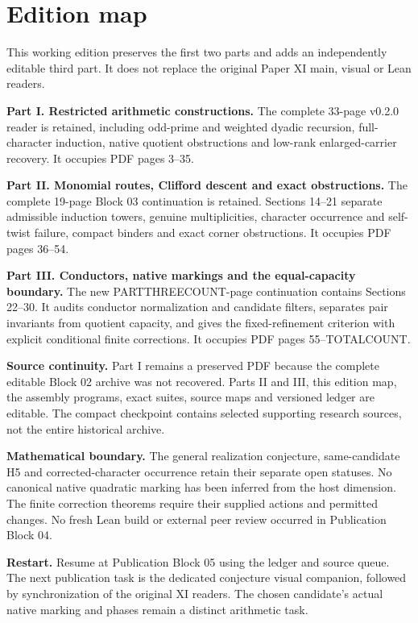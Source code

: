 \documentclass[11pt]{article}
\begin{document}
\KomorebiCover
\section*{Edition map}
This working edition preserves the first two parts and adds an independently editable third part. It does not replace the original Paper XI main, visual or Lean readers.

\textbf{Part I. Restricted arithmetic constructions.} The complete 33-page v0.2.0 reader is retained, including odd-prime and weighted dyadic recursion, full-character induction, native quotient obstructions and low-rank enlarged-carrier recovery. It occupies PDF pages 3--35.

\textbf{Part II. Monomial routes, Clifford descent and exact obstructions.} The complete 19-page Block 03 continuation is retained. Sections 14--21 separate admissible induction towers, genuine multiplicities, character occurrence and self-twist failure, compact binders and exact corner obstructions. It occupies PDF pages 36--54.

\textbf{Part III. Conductors, native markings and the equal-capacity boundary.} The new PARTTHREECOUNT-page continuation contains Sections 22--30. It audits conductor normalization and candidate filters, separates pair invariants from quotient capacity, and gives the fixed-refinement criterion with explicit conditional finite corrections. It occupies PDF pages 55--TOTALCOUNT.

\textbf{Source continuity.} Part I remains a preserved PDF because the complete editable Block 02 archive was not recovered. Parts II and III, this edition map, the assembly programs, exact suites, source maps and versioned ledger are editable. The compact checkpoint contains selected supporting research sources, not the entire historical archive.

\textbf{Mathematical boundary.} The general realization conjecture, same-candidate H5 and corrected-character occurrence retain their separate open statuses. No canonical native quadratic marking has been inferred from the host dimension. The finite correction theorems require their supplied actions and permitted changes. No fresh Lean build or external peer review occurred in Publication Block 04.

\textbf{Restart.} Resume at Publication Block 05 using the ledger and source queue. The next publication task is the dedicated conjecture visual companion, followed by synchronization of the original XI readers. The chosen candidate's actual native marking and phases remain a distinct arithmetic task.
\end{document}
